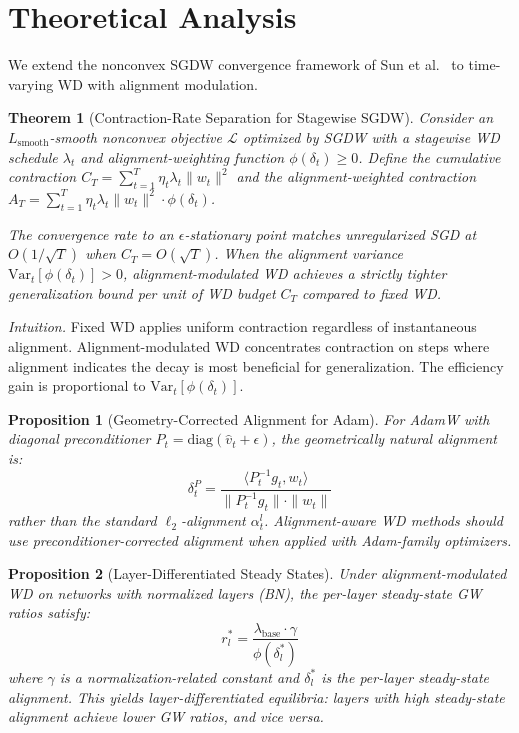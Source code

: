 \documentclass{article}
\newtheorem{theorem}{Theorem}
\newtheorem{proposition}{Proposition}
\begin{document}
\section{Theoretical Analysis}
\label{sec:theory}

We extend the nonconvex SGDW convergence framework of Sun et al.~\citep{sun2025convergence} to time-varying WD with alignment modulation.

\begin{theorem}[Contraction-Rate Separation for Stagewise SGDW]
\label{thm:contraction}
Consider an $L_{\text{smooth}}$-smooth nonconvex objective $\mathcal{L}$ optimized by SGDW with a stagewise WD schedule $\lambda_t$ and alignment-weighting function $\phi(\delta_t) \geq 0$. Define the cumulative contraction $C_T = \sum_{t=1}^{T} \eta_t \lambda_t \|w_t\|^2$ and the alignment-weighted contraction $A_T = \sum_{t=1}^{T} \eta_t \lambda_t \|w_t\|^2 \cdot \phi(\delta_t)$.

The convergence rate to an $\epsilon$-stationary point matches unregularized SGD at $O(1/\sqrt{T})$ when $C_T = O(\sqrt{T})$. When the alignment variance $\text{Var}_t[\phi(\delta_t)] > 0$, alignment-modulated WD achieves a strictly tighter generalization bound per unit of WD budget $C_T$ compared to fixed WD.
\end{theorem}

\textit{Intuition.} Fixed WD applies uniform contraction regardless of instantaneous alignment. Alignment-modulated WD concentrates contraction on steps where alignment indicates the decay is most beneficial for generalization. The efficiency gain is proportional to $\text{Var}_t[\phi(\delta_t)]$.

\begin{proposition}[Geometry-Corrected Alignment for Adam]
\label{prop:geometry}
For AdamW with diagonal preconditioner $P_t = \mathrm{diag}(\hat{v}_t + \epsilon)$, the geometrically natural alignment is:
\begin{equation}
  \delta_t^P = \frac{\langle P_t^{-1} g_t, w_t \rangle}{\|P_t^{-1} g_t\| \cdot \|w_t\|}
\end{equation}
rather than the standard $\ell_2$-alignment $\alpha_t^l$. Alignment-aware WD methods should use preconditioner-corrected alignment when applied with Adam-family optimizers.
\end{proposition}

\begin{proposition}[Layer-Differentiated Steady States]
\label{prop:steady}
Under alignment-modulated WD on networks with normalized layers (BN), the per-layer steady-state GW ratios satisfy:
\begin{equation}
  r_l^* = \frac{\lambda_{\text{base}} \cdot \gamma}{\phi(\delta_l^*)}
\end{equation}
where $\gamma$ is a normalization-related constant and $\delta_l^*$ is the per-layer steady-state alignment. This yields layer-differentiated equilibria: layers with high steady-state alignment achieve lower GW ratios, and vice versa.
\end{proposition}
\end{document}
